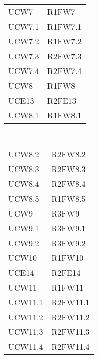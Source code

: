 \begin{table}[!htbp]
\begin{tabular}[t]{ m{}<{\centering}  m{}<{\centering} }
	UCW7 & R1FW7 \\	
	
	UCW7.1 & R1FW7.1 \\

	UCW7.2 & R1FW7.2 \\
	
	UCW7.3 & R2FW7.3 \\
	
	UCW7.4 & R2FW7.4	\\		
	
	UCW8 & R1FW8 \\		
	
	UCE13 & R2FE13  \\	
	 
	UCW8.1 & R1FW8.1 \\	

\end{tabular}
\begin{tabular}[t]{ m{}<{\centering}  m{}<{\centering} }
	\rowcolor{darkblue}
	\textcolor{white}{\textbf{Fonte}} &\textcolor{white}{\textbf{Requisiti}}\\ 
	 
	UCW8.2 & R2FW8.2 \\	
	 
	UCW8.3 & R2FW8.3\\	
	 
	UCW8.4 & R2FW8.4 \\	 
	 
	UCW8.5 & R1FW8.5 \\	 
	 
	UCW9 & R3FW9 \\	
	 
	UCW9.1 & R3FW9.1\\	 
	 
	UCW9.2 & R3FW9.2\\	  
	 
	UCW10 & R1FW10 \\	 
	 
	UCE14 & R2FE14\\	 
	 	 
	UCW11 & R1FW11\\	 	
	
 	UCW11.1 & R2FW11.1 \\
 	
 	UCW11.2 & R2FW11.2 \\
 	
	UCW11.3 & R2FW11.3 \\
 
	UCW11.4 & R2FW11.4 \\
	

\end{tabular}
\end{table}
